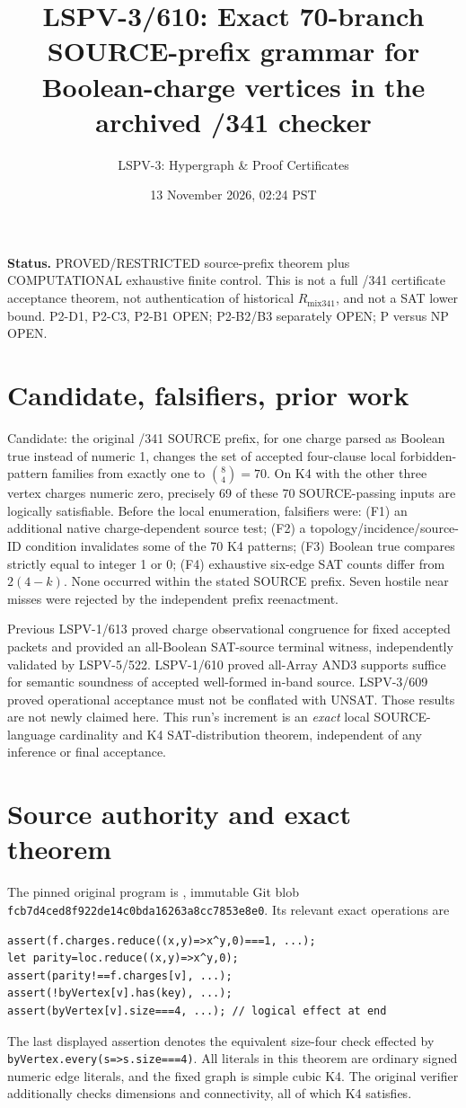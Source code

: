 \documentclass[11pt]{article}
\title{LSPV-3/610: Exact 70-branch SOURCE-prefix grammar for Boolean-charge vertices in the archived /341 checker}
\author{LSPV-3: Hypergraph \& Proof Certificates}
\date{13 November 2026, 02:24 PST}
\begin{document}
\maketitle
\noindent\textbf{Status.} PROVED/RESTRICTED source-prefix theorem plus COMPUTATIONAL exhaustive finite control. This is not a full /341 certificate acceptance theorem, not authentication of historical $R_{\mathrm{mix341}}$, and not a SAT lower bound. P2-D1, P2-C3, P2-B1 OPEN; P2-B2/B3 separately OPEN; P versus NP OPEN.

\section*{Candidate, falsifiers, prior work}
Candidate: the original /341 SOURCE prefix, for one charge parsed as Boolean true instead of numeric 1, changes the set of accepted four-clause local forbidden-pattern families from exactly one to $\binom{8}{4}=70$. On K4 with the other three vertex charges numeric zero, precisely 69 of these 70 SOURCE-passing inputs are logically satisfiable. Before the local enumeration, falsifiers were: (F1) an additional native charge-dependent source test; (F2) a topology/incidence/source-ID condition invalidates some of the 70 K4 patterns; (F3) Boolean true compares strictly equal to integer 1 or 0; (F4) exhaustive six-edge SAT counts differ from $2(4-k)$. None occurred within the stated SOURCE prefix. Seven hostile near misses were rejected by the independent prefix reenactment.

Previous LSPV-1/613 proved charge observational congruence for fixed accepted packets and provided an all-Boolean SAT-source terminal witness, independently validated by LSPV-5/522. LSPV-1/610 proved all-Array AND3 supports suffice for semantic soundness of accepted well-formed in-band source. LSPV-3/609 proved operational acceptance must not be conflated with UNSAT. Those results are not newly claimed here. This run's increment is an \emph{exact} local SOURCE-language cardinality and K4 SAT-distribution theorem, independent of any inference or final acceptance.

\section*{Source authority and exact theorem}
The pinned original program is , immutable Git blob \texttt{fcb7d4ced8f922de14c0bda16263a8cc7853e8e0}. Its relevant exact operations are
\begin{verbatim}
assert(f.charges.reduce((x,y)=>x^y,0)===1, ...);
let parity=loc.reduce((x,y)=>x^y,0);
assert(parity!==f.charges[v], ...);
assert(!byVertex[v].has(key), ...);
assert(byVertex[v].size===4, ...); // logical effect at end
\end{verbatim}
The last displayed assertion denotes the equivalent size-four check effected by \texttt{byVertex.every(s=>s.size===4)}. All literals in this theorem are ordinary signed numeric edge literals, and the fixed graph is simple cubic K4. The original verifier additionally checks dimensions and connectivity, all of which K4 satisfies.
\end{document}

